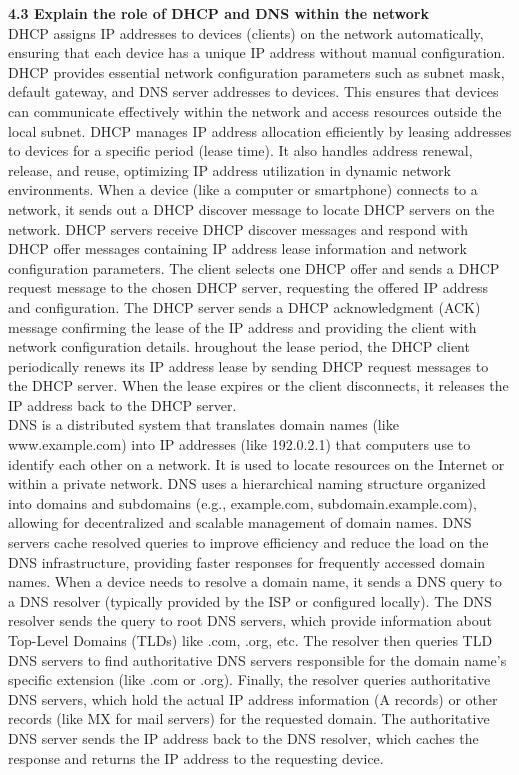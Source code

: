 \documentclass{article}
\begin{document}
\textbf{4.3 Explain the role of DHCP and DNS within the network}\\

	DHCP assigns IP addresses to devices (clients) on the network automatically, ensuring that each device has a unique IP address without manual configuration. DHCP provides essential network configuration parameters such as subnet mask, default gateway, and DNS server addresses to devices. This ensures that devices can communicate effectively within the network and access resources outside the local subnet. DHCP manages IP address allocation efficiently by leasing addresses to devices for a specific period (lease time). It also handles address renewal, release, and reuse, optimizing IP address utilization in dynamic network environments. When a device (like a computer or smartphone) connects to a network, it sends out a DHCP discover message to locate DHCP servers on the network. DHCP servers receive DHCP discover messages and respond with DHCP offer messages containing IP address lease information and network configuration parameters. The client selects one DHCP offer and sends a DHCP request message to the chosen DHCP server, requesting the offered IP address and configuration. The DHCP server sends a DHCP acknowledgment (ACK) message confirming the lease of the IP address and providing the client with network configuration details. hroughout the lease period, the DHCP client periodically renews its IP address lease by sending DHCP request messages to the DHCP server. When the lease expires or the client disconnects, it releases the IP address back to the DHCP server.\\

	DNS is a distributed system that translates domain names (like www.example.com) into IP addresses (like 192.0.2.1) that computers use to identify each other on a network. It is used to locate resources on the Internet or within a private network. DNS uses a hierarchical naming structure organized into domains and subdomains (e.g., example.com, subdomain.example.com), allowing for decentralized and scalable management of domain names. DNS servers cache resolved queries to improve efficiency and reduce the load on the DNS infrastructure, providing faster responses for frequently accessed domain names. When a device needs to resolve a domain name, it sends a DNS query to a DNS resolver (typically provided by the ISP or configured locally). The DNS resolver sends the query to root DNS servers, which provide information about Top-Level Domains (TLDs) like .com, .org, etc. The resolver then queries TLD DNS servers to find authoritative DNS servers responsible for the domain name's specific extension (like .com or .org). Finally, the resolver queries authoritative DNS servers, which hold the actual IP address information (A records) or other records (like MX for mail servers) for the requested domain. The authoritative DNS server sends the IP address back to the DNS resolver, which caches the response and returns the IP address to the requesting device.\\
  
\end{document}

